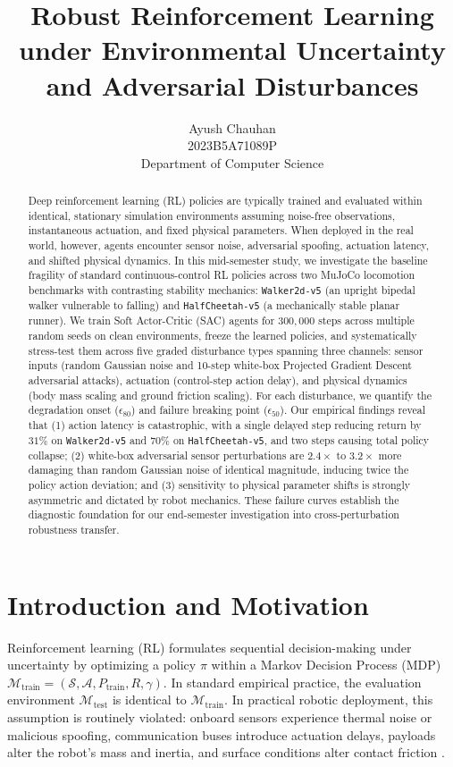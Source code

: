 \documentclass{article}
\title{Robust Reinforcement Learning under Environmental Uncertainty and Adversarial Disturbances}
\author{{Ayush Chauhan} \\
	2023B5A71089P\\
    Department of Computer Science
}
\begin{document}
\maketitle

\begin{abstract}
Deep reinforcement learning (RL) policies are typically trained and evaluated within identical, stationary simulation environments assuming noise-free observations, instantaneous actuation, and fixed physical parameters. When deployed in the real world, however, agents encounter sensor noise, adversarial spoofing, actuation latency, and shifted physical dynamics. In this mid-semester study, we investigate the baseline fragility of standard continuous-control RL policies across two MuJoCo locomotion benchmarks with contrasting stability mechanics: \texttt{Walker2d-v5} (an upright bipedal walker vulnerable to falling) and \texttt{HalfCheetah-v5} (a mechanically stable planar runner). We train Soft Actor-Critic (SAC) agents for $300{,}000$ steps across multiple random seeds on clean environments, freeze the learned policies, and systematically stress-test them across five graded disturbance types spanning three channels: sensor inputs (random Gaussian noise and 10-step white-box Projected Gradient Descent adversarial attacks), actuation (control-step action delay), and physical dynamics (body mass scaling and ground friction scaling). For each disturbance, we quantify the degradation onset ($\epsilon_{80}$) and failure breaking point ($\epsilon_{50}$). Our empirical findings reveal that (1) action latency is catastrophic, with a single delayed step reducing return by $31\%$ on \texttt{Walker2d-v5} and $70\%$ on \texttt{HalfCheetah-v5}, and two steps causing total policy collapse; (2) white-box adversarial sensor perturbations are $2.4\times$ to $3.2\times$ more damaging than random Gaussian noise of identical magnitude, inducing twice the policy action deviation; and (3) sensitivity to physical parameter shifts is strongly asymmetric and dictated by robot mechanics. These failure curves establish the diagnostic foundation for our end-semester investigation into cross-perturbation robustness transfer.
\end{abstract}


\section{Introduction and Motivation}

Reinforcement learning (RL) formulates sequential decision-making under uncertainty by optimizing a policy $\pi$ within a Markov Decision Process (MDP) $\mathcal{M}_{\text{train}} = (\mathcal{S}, \mathcal{A}, P_{\text{train}}, R, \gamma)$. In standard empirical practice, the evaluation environment $\mathcal{M}_{\text{test}}$ is identical to $\mathcal{M}_{\text{train}}$. In practical robotic deployment, this assumption is routinely violated: onboard sensors experience thermal noise or malicious spoofing, communication buses introduce actuation delays, payloads alter the robot's mass and inertia, and surface conditions alter contact friction \citep{gu2025robust}.
\end{document}
